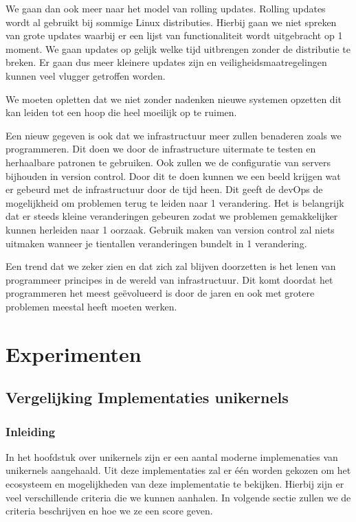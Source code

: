\documentclass[pdftex,a4paper,12pt,twoside]{report}
\begin{document}
We gaan dan ook meer naar het model van rolling updates. Rolling updates wordt al gebruikt bij sommige Linux distributies. Hierbij gaan we niet spreken van grote updates waarbij er een lijst van functionaliteit wordt uitgebracht op 1 moment. We gaan updates op gelijk welke tijd uitbrengen zonder de distributie te breken. Er gaan dus meer kleinere updates zijn en veiligheidsmaatregelingen kunnen veel vlugger getroffen worden.

We moeten opletten dat we niet zonder nadenken nieuwe systemen opzetten dit kan leiden tot een hoop die heel moeilijk op te ruimen. 

Een nieuw gegeven is ook dat we infrastructuur meer zullen benaderen zoals we programmeren. Dit doen we door de infrastructure uitermate te testen en herhaalbare patronen te gebruiken. Ook zullen we de configuratie van servers bijhouden in version control. Door dit te doen kunnen we een beeld krijgen wat er gebeurd met de infrastructuur door de tijd heen. Dit geeft de devOps de mogelijkheid om problemen terug te leiden naar 1 verandering. Het is belangrijk dat er steeds kleine veranderingen gebeuren zodat we problemen gemakkelijker kunnen herleiden naar 1 oorzaak. Gebruik maken van version control zal niets uitmaken wanneer je tientallen veranderingen bundelt in 1 verandering. 

Een trend dat we zeker zien en dat zich zal blijven doorzetten is het lenen van programmeer principes in de wereld van infrastructuur. Dit komt doordat het programmeren het meest geëvolueerd is door de jaren en ook met grotere problemen meestal heeft moeten werken.

\chapter{Experimenten}
\label{ch:experimenten}

\section{Vergelijking Implementaties unikernels}

\subsection{Inleiding}

In het hoofdstuk over unikernels zijn er een aantal moderne implemenaties van unikernels aangehaald. Uit deze implementaties zal er één worden gekozen om het ecosysteem en mogelijkheden van deze implementatie te bekijken. Hierbij zijn er veel verschillende criteria die we kunnen aanhalen. In volgende sectie zullen we de criteria beschrijven en hoe we ze een score geven.
\end{document}
